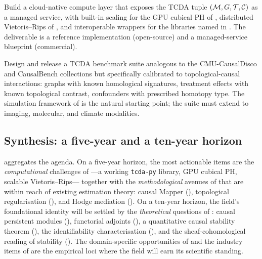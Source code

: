 \begin{research}
\label{r:infrastructure}
Build a cloud-native compute layer that exposes the TCDA tuple
$(\mathcal{M}, G, \mathcal{T}, \mathcal{C})$ as a managed service, with built-in scaling for
the GPU cubical PH of , distributed Vietoris--Rips
of , and interoperable wrappers for the libraries
named in . The deliverable is a reference
implementation (open-source) and a managed-service blueprint
(commercial).
\end{research}

\begin{research}\label{r:benchmarks}
Design and release a TCDA benchmark suite analogous to the
CMU-CausalDisco and CausalBench collections
\citep{causaldisco2023survey,timeseriescd2023} but specifically
calibrated to topological-causal interactions: graphs with known
homological signatures, treatment effects with known topological
contrast, confounders with prescribed homotopy type. The simulation
framework of \citet{elyaagoubi2023statistical} is the natural
starting point; the suite must extend to imaging, molecular, and
climate modalities.
\end{research}



\subsection{Synthesis: a five-year and a ten-year horizon}
\label{sec:research_synth}

 aggregates the agenda. On a five-year
horizon, the most actionable items are the \emph{computational}
challenges of ---a working
\texttt{tcda-py} library, GPU cubical PH, scalable Vietoris--Rips---
together with the \emph{methodological} avenues of
 that are within reach of existing
estimation theory: causal Mapper (),
topological regularisation (), and Hodge
mediation (). On a ten-year horizon, the
field's foundational identity will be settled by the \emph{theoretical}
questions of : causal persistent modules
(), functorial adjoints
(), a quantitative causal stability theorem
(), the identifiability characterisation
(), and the sheaf-cohomological reading
of stability (). The domain-specific opportunities
of  and the industry items of
 are the empirical loci where the field
will earn its scientific standing.

